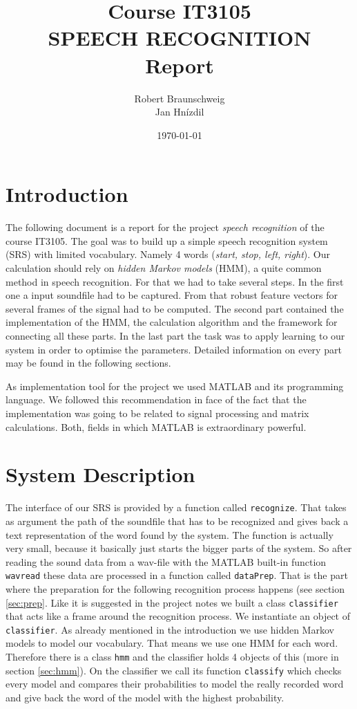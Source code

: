 \documentclass[a4paper,english,11pt,oneside]{article}
\title{Course IT3105 \\ SPEECH RECOGNITION \\ Report}
\author{Robert Braunschweig \\ Jan Hn\'{i}zdil}
\date{\today}
\begin{document}
\lstset{basicstyle=\ttfamily, showspaces=false, tabsize=4}
\maketitle
\thispagestyle{empty}
\cleardoublepage
\tableofcontents
\cleardoublepage
\setcounter{page}{1}

\section{Introduction}
The following document is a report for the project \emph{speech recognition} of the course IT3105. The goal was to build up a simple speech recognition system (SRS) with limited vocabulary. Namely 4 words (\emph{start, stop, left, right}). Our calculation should rely on \emph{hidden Markov models} (HMM), a quite common method in speech recognition. For that we had to take several steps. In the first one a input soundfile had to be captured. From that robust feature vectors for several frames of the signal had to be computed. The second part contained the implementation of the HMM, the calculation algorithm and the framework for connecting all these parts. In the last part the task was to apply learning to our system in order to optimise the parameters. Detailed information on every part may be found in the following sections.

As implementation tool for the project we used MATLAB and its programming language. We followed this recommendation in face of the fact that the implementation was going to be related to signal processing and matrix calculations. Both, fields in which MATLAB is extraordinary powerful.

\section{System Description}
The interface of our SRS is provided by a function called \lstinline&recognize&. That takes as argument the path of the soundfile that has to be recognized and gives back a text representation of the word found by the system. The function is actually very small, because it basically just starts the bigger parts of the system. So after reading the sound data from a wav-file with the MATLAB built-in function \lstinline&wavread& these data are processed in a function called \lstinline&dataPrep&. That is the part where the preparation for the following recognition process happens (see section \ref{sec:prep}.
Like it is suggested in the project notes we built a class \lstinline&classifier& that acts like a frame around the recognition process. We instantiate an object of \lstinline&classifier&. As already mentioned in the introduction we use hidden Markov models to model our vocabulary. That means we use one HMM for each word. Therefore there is a class \lstinline&hmm& and the classifier holds 4 objects of this (more in section \ref{sec:hmm}). On the classifier we call its function \lstinline&classify& which checks every model and compares their probabilities to model the really recorded word and give back the word of the model with the highest probability.
\end{document}
